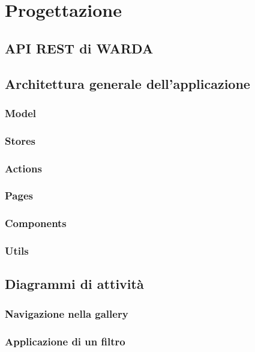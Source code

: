 
\chapter{Progettazione}
\label{cap:progettazione}


\section{API REST di WARDA}

\section{Architettura generale dell'applicazione}

\subsection{Model}

\subsection{Stores}

\subsection{Actions}

\subsection{Pages}

\subsection{Components}

\subsection{Utils}


\section{Diagrammi di attività}

\subsection{Navigazione nella gallery}

\subsection{Applicazione di un filtro}
